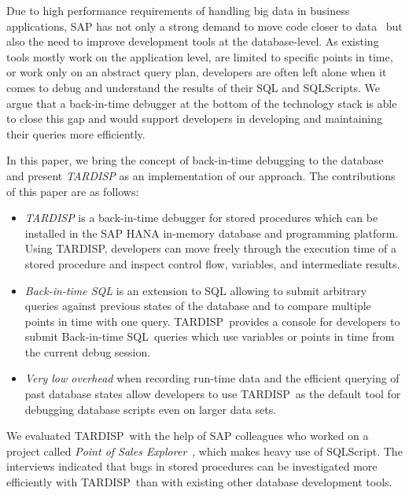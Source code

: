 \documentclass[english,conference]{IEEEtran}
\newcommand{\tool}{TAR\-DISP}
\newcommand{\SQLextension}{Back-in-time SQL}
\begin{document}
Due to high performance requirements of handling big data in business applications, SAP has not only a strong demand to move code closer to data~\cite{plattner2015memory} but also the need to improve development tools at the database-level. 
As existing tools mostly work on the application level, are limited to specific points in time, or work only on an abstract query plan, developers are often left alone when it comes to debug and understand the results of their SQL and SQLScripts.
We argue that a back-in-time debugger at the bottom of the technology stack is able to close this gap and would support developers in developing and maintaining their queries more efficiently. 

In this paper, we bring the concept of back-in-time debugging to the database and present \emph{\tool} as an implementation of our approach.
The contributions of this paper are as follows:
\begin{itemize}
	\item \emph{\tool} is a back-in-time debugger for stored procedures which can be installed in the SAP HANA in-memory database and programming platform.
		Using \tool, developers can move freely through the execution time of a stored procedure and inspect control flow, variables, and intermediate results.
	
	\item \emph{\SQLextension} is an extension to SQL allowing to submit arbitrary queries against previous states of the database 
		and to compare multiple points in time with one query.
		\tool\ provides a console for developers to submit \SQLextension\ queries which use variables or points in time from the current debug session.

	\item \emph{Very low overhead} when recording run-time data and the efficient querying of past database states allow developers to use \tool\ as the default tool for debugging database scripts even on larger data sets.
	
\end{itemize}

We evaluated \tool\ with the help of SAP colleagues who worked on a project called \emph{Point of Sales Explorer}~\cite{plattner2015memory}, which makes heavy use of SQLScript. 
The interviews indicated that bugs in stored procedures can be investigated more efficiently with \tool\ than with existing other database development tools.
\end{document}
